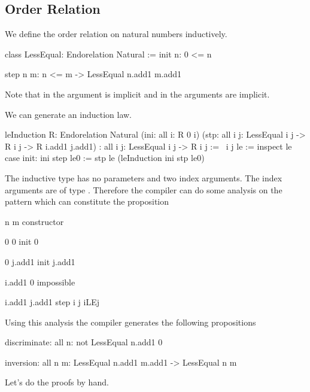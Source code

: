 \subsection{Order Relation}

We define the order relation on natural numbers inductively.

\begin{alba}
    class
        LessEqual: Endorelation Natural
    :=
        init {n}:
            0 <= n

        step {n m}:
            n <= m
            -> LessEqual n.add1 m.add1
\end{alba}
%
Note that in  the argument  is implicit and in  the arguments  are implicit.

We can generate an induction law.
\begin{alba}
    leInduction
        {R: Endorelation Natural}
        (ini: all {i}: R 0 i)
        (stp: all {i j}: LessEqual i j -> R i j -> R i.add1 j.add1)
        : all {i j}: LessEqual i j -> R i j
    :=
        \ {i j} le :=
            inspect le case
                init: ini
                step le0 := stp le (leInduction ini stp le0)
\end{alba}

The inductive type has no parameters and two index arguments. The index
arguments are of type . Therefore the compiler can do some analysis
on the pattern which can constitute the proposition 

\begin{alba}
        n               m                   constructor

        0               0                   init 0

        0               j.add1              init j.add1

        i.add1          0                   impossible

        i.add1          j.add1              step i j iLEj
\end{alba}
%
Using this analysis the compiler generates the following propositions
\begin{alba}
    discriminate: all n: not LessEqual n.add1 0

    inversion: all n m: LessEqual n.add1 m.add1 -> LessEqual n m
\end{alba}

Let's do the proofs by hand.

